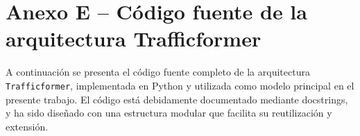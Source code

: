 \section*{Anexo E – Código fuente de la arquitectura Trafficformer}
\label{anexo:codigo_trafficformer}

A continuación se presenta el código fuente completo de la arquitectura \texttt{Trafficformer}, implementada en Python y utilizada como modelo principal en el presente trabajo. El código está debidamente documentado mediante docstrings, y ha sido diseñado con una estructura modular que facilita su reutilización y extensión.

